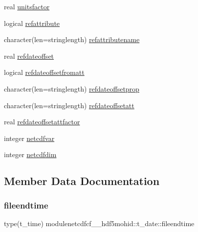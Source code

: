 \begin{DoxyCompactItemize}
\item 
real \mbox{\hyperlink{structmodulenetcdfcf__2__hdf5mohid_1_1t__date_ab151ff2790b896e1e1d86db55931bf8d}{unitsfactor}}
\item 
logical \mbox{\hyperlink{structmodulenetcdfcf__2__hdf5mohid_1_1t__date_a1d1c5ce4af319eb844b2c76573563877}{refattribute}}
\item 
character(len=stringlength) \mbox{\hyperlink{structmodulenetcdfcf__2__hdf5mohid_1_1t__date_a8a597b9fa9db08bcb0ec38835d2718ca}{refattributename}}
\item 
real \mbox{\hyperlink{structmodulenetcdfcf__2__hdf5mohid_1_1t__date_a7222a0a87c7710e2d23ca7ae029ad001}{refdateoffset}}
\item 
logical \mbox{\hyperlink{structmodulenetcdfcf__2__hdf5mohid_1_1t__date_a48d11d000571d923138c3a89866cab4f}{refdateoffsetfromatt}}
\item 
character(len=stringlength) \mbox{\hyperlink{structmodulenetcdfcf__2__hdf5mohid_1_1t__date_af0a39d8fd8432ec8a9be907601cf92af}{refdateoffsetprop}}
\item 
character(len=stringlength) \mbox{\hyperlink{structmodulenetcdfcf__2__hdf5mohid_1_1t__date_a73713ac5f80343fc510265bf79b5d86b}{refdateoffsetatt}}
\item 
real \mbox{\hyperlink{structmodulenetcdfcf__2__hdf5mohid_1_1t__date_ad57934989d1fb9101f072bf9a6882be5}{refdateoffsetattfactor}}
\item 
integer \mbox{\hyperlink{structmodulenetcdfcf__2__hdf5mohid_1_1t__date_a7acb1570f4ae5476135d174db9179928}{netcdfvar}}
\item 
integer \mbox{\hyperlink{structmodulenetcdfcf__2__hdf5mohid_1_1t__date_a4dd99d6a3d9cb0ae75825c9fa5a70bca}{netcdfdim}}
\end{DoxyCompactItemize}


\subsection{Member Data Documentation}
\mbox{\label{structmodulenetcdfcf__2__hdf5mohid_1_1t__date_a6dec5c4dc579df77919c2026c1f60674}} 
\subsubsection{\texorpdfstring{fileendtime}{fileendtime}}
{\footnotesize\ttfamily type(t\+\_\+time) modulenetcdfcf\+\_\+\_\+hdf5mohid\+::t\+\_\+date\+::fileendtime\hspace{0.3cm}{\ttfamily [private]}}

